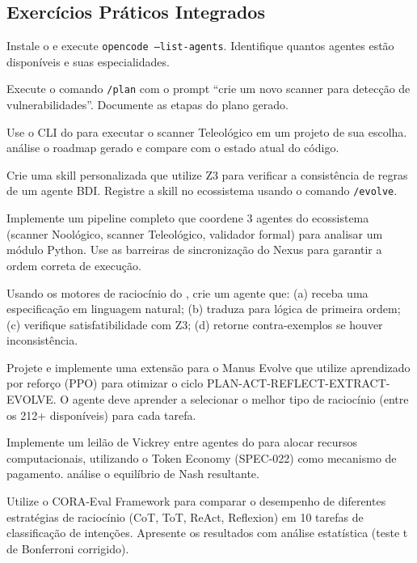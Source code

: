\subsection{Exercícios Práticos Integrados}
\begin{exercicio}[Nivel 0]
Instale o \opencodeeco{} e execute \texttt{opencode --list-agents}.
Identifique quantos agentes estão disponíveis e suas especialidades.
\end{exercicio}
\begin{exercicio}
Execute o comando \texttt{/plan} com o prompt ``crie um novo scanner para
detecção de vulnerabilidades''. Documente as etapas do plano gerado.
\end{exercicio}
\begin{exercicio}
Use o CLI do \opencodeeco{} para executar o scanner Teleológico em um
projeto de sua escolha. análise o roadmap gerado e compare com o estado
atual do código.
\end{exercicio}
\begin{exercicio}
Crie uma skill personalizada que utilize Z3 para verificar a consistência
de regras de um agente BDI. Registre a skill no ecossistema usando o
comando \texttt{/evolve}.
\end{exercicio}
\begin{exercicio}
Implemente um pipeline completo que coordene 3 agentes do ecossistema
(scanner Noológico, scanner Teleológico, validador formal) para analisar
um módulo Python. Use as barreiras de sincronização do Nexus para garantir
a ordem correta de execução.
\end{exercicio}
\begin{exercicio}
Usando os motores de raciocínio do \opencodeeco{}, crie um agente que:
(a) receba uma especificação em linguagem natural; (b) traduza para lógica
de primeira ordem; (c) verifique satisfatibilidade com Z3;
(d) retorne contra-exemplos se houver inconsistência.
\end{exercicio}
\begin{exercicio}
Projete e implemente uma extensão para o Manus Evolve que utilize
aprendizado por reforço (PPO) para otimizar o ciclo
PLAN-ACT-REFLECT-EXTRACT-EVOLVE. O agente deve aprender a selecionar o
melhor tipo de raciocínio (entre os 212+ disponíveis) para cada tarefa.
\end{exercicio}
\begin{exercicio}
Implemente um leilão de Vickrey entre agentes do \opencodeeco{} para
alocar recursos computacionais, utilizando o Token Economy (SPEC-022)
como mecanismo de pagamento. análise o equilíbrio de Nash resultante.
\end{exercicio}
\begin{exercicio}
Utilize o CORA-Eval Framework para comparar o desempenho de diferentes
estratégias de raciocínio (CoT, ToT, ReAct, Reflexion) em 10 tarefas
de classificação de intenções. Apresente os resultados com análise
estatística (teste t de Bonferroni corrigido).
\end{exercicio}
